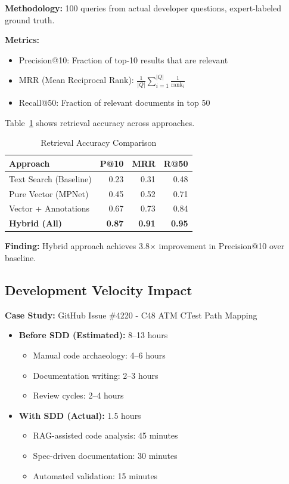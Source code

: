 \documentclass[11pt,letterpaper]{article}
\begin{document}
\textbf{Methodology:} 100 queries from actual developer questions, expert-labeled ground truth.

\textbf{Metrics:}
\begin{itemize}
    \item Precision@10: Fraction of top-10 results that are relevant
    \item MRR (Mean Reciprocal Rank): $\frac{1}{|Q|} \sum_{i=1}^{|Q|} \frac{1}{\text{rank}_i}$
    \item Recall@50: Fraction of relevant documents in top 50
\end{itemize}

Table~\ref{tab:results} shows retrieval accuracy across approaches.

\begin{table}[h]
\centering
\caption{Retrieval Accuracy Comparison}
\label{tab:results}
\begin{tabular}{@{}lrrr@{}}
\toprule
\textbf{Approach} & \textbf{P@10} & \textbf{MRR} & \textbf{R@50} \\
\midrule
Text Search (Baseline) & 0.23 & 0.31 & 0.48 \\
Pure Vector (MPNet) & 0.45 & 0.52 & 0.71 \\
Vector + Annotations & 0.67 & 0.73 & 0.84 \\
\textbf{Hybrid (All)} & \textbf{0.87} & \textbf{0.91} & \textbf{0.95} \\
\bottomrule
\end{tabular}
\end{table}

\textbf{Finding:} Hybrid approach achieves 3.8$\times$ improvement in Precision@10 over baseline.

\subsection{Development Velocity Impact}

\textbf{Case Study:} GitHub Issue \#4220 - C48 ATM CTest Path Mapping

\begin{itemize}
    \item \textbf{Before SDD (Estimated):} 8--13 hours
    \begin{itemize}
        \item Manual code archaeology: 4--6 hours
        \item Documentation writing: 2--3 hours
        \item Review cycles: 2--4 hours
    \end{itemize}
    \item \textbf{With SDD (Actual):} 1.5 hours
    \begin{itemize}
        \item RAG-assisted code analysis: 45 minutes
        \item Spec-driven documentation: 30 minutes
        \item Automated validation: 15 minutes
    \end{itemize}
\end{itemize}
\end{document}
